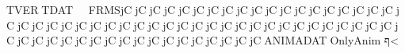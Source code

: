 TVER   TDAT                   FRMSjCjCjCjCjCjCjCjCjCjCjCjCjCjCjCjCjCjCjCjCjCjCjCjCjCjCjCjCjCjCjCjCjCjCjCjCjCjCjCjCjCjCjCjCjCjCjCjCjCjCjCjCjCjCjCjCjCjCjCjCjCjCjCjCANIMADAT   OnlyAnim                        
ף<       